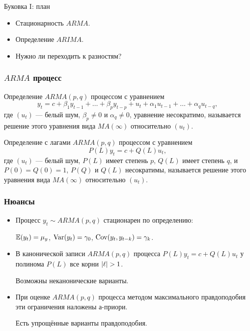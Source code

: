 
\begin{frame} %


\end{frame}



\begin{frame}{Буковка I: план}
  \begin{itemize}[<+->]
    \item Стационарность $ARMA$. 
    \item Определение $ARIMA$.
    \item Нужно ли переходить к разностям?
  \end{itemize}

\end{frame}


\begin{frame}
  \frametitle{$ARMA$ процесс}

  \begin{block}{Определение}
    $ARMA(p, q)$ процессом с уравнением 
    \[
      y_t = c + \beta_1 y_{t-1} + \ldots + \beta_p y_{t-p} + u_t + \alpha_1 u_{t-1} + \ldots + \alpha_q u_{t-q}, 
    \]
    где $(u_t)$ — белый шум, $\beta_p \neq 0$ и $\alpha_q \neq 0$, уравнение несократимо, называется 
    решение этого уравнения вида $MA(\infty)$ относительно $(u_t)$.
  \end{block}

  \pause  
  \begin{block}{Определение с лагами}
    $ARMA(p,q)$ процессом с уравнением 
    \[
      P(L)y_t = c + Q(L)u_t, 
    \]
    где $(u_t)$ — белый шум, $P(L)$ имеет степень $p$, $Q(L)$ имеет степень $q$, и $P(0)=Q(0)=1$, 
    $P(Q)$ и $Q(L)$ несократимы, называется решение этого уравнения вида $MA(\infty)$ относительно $(u_t)$.  
  \end{block}
\end{frame}

\begin{frame}
  \frametitle{Нюансы}

  \begin{itemize}[<+->]
    \item Процесс $y_t \sim ARMA(p, q)$ стационарен \alert{по определению}:
    
    $\mathbb{E}(y_t) = \mu_y$, $\operatorname{Var}(y_t) = \gamma_0$, $\operatorname{Cov}(y_t, y_{t-k}) = \gamma_k$.

    \item В \alert{канонической записи} $ARMA(p, q)$ процесса $P(L) y_t = c+ Q(L) u_t$ у полинома $P(L)$
    все корни $\abs{\ell} > 1$. 

    Возможны неканонические варианты.   

    \item При оценке $ARMA(p, q)$ процесса методом максимального правдоподобия эти ограничения наложены \alert{а-приори}. 
    
    Есть упрощённые варианты правдоподобия.
  \end{itemize}

\end{frame}


